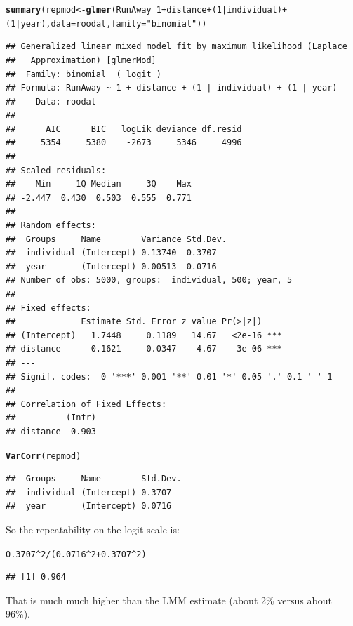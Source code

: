 \documentclass[12pt,a4paper]{scrartcl}\usepackage[]{graphicx}\usepackage[]{color}
\makeatletter
\newcommand{\hlnum}[1]{\textcolor[rgb]{0.686,0.059,0.569}{#1}}%
\newcommand{\hlstr}[1]{\textcolor[rgb]{0.192,0.494,0.8}{#1}}%
\newcommand{\hlopt}[1]{\textcolor[rgb]{0,0,0}{#1}}%
\newcommand{\hlstd}[1]{\textcolor[rgb]{0.345,0.345,0.345}{#1}}%
\newcommand{\hlkwb}[1]{\textcolor[rgb]{0.69,0.353,0.396}{#1}}%
\newcommand{\hlkwc}[1]{\textcolor[rgb]{0.333,0.667,0.333}{#1}}%
\newcommand{\hlkwd}[1]{\textcolor[rgb]{0.737,0.353,0.396}{\textbf{#1}}}%
\newenvironment{kframe}{%
 \def\at@end@of@kframe{}%
 \ifinner\ifhmode%
  \def\at@end@of@kframe{\end{minipage}}%
  \begin{minipage}{\columnwidth}%
 \fi\fi%
 \def\FrameCommand##1{\hskip\@totalleftmargin \hskip-\fboxsep
 \colorbox{shadecolor}{##1}\hskip-\fboxsep
     \hskip-\linewidth \hskip-\@totalleftmargin \hskip\columnwidth}%
 \MakeFramed {\advance\hsize-\width
   \@totalleftmargin\z@ \linewidth\hsize
   \@setminipage}}%
 {\par\unskip\endMakeFramed%
 \at@end@of@kframe}
\newenvironment{knitrout}{}{} %
\makeatother
\begin{document}
\begin{Answer}
\begin{knitrout}
\color{fgcolor}\begin{kframe}
\begin{alltt}
\hlkwd{summary}\hlstd{(repmod} \hlkwb{<-} \hlkwd{glmer}\hlstd{(RunAway} \hlopt{~} \hlnum{1} \hlopt{+} \hlstd{distance} \hlopt{+}\hlstd{(}\hlnum{1}\hlopt{|}\hlstd{individual)} \hlopt{+}
                          \hlstd{(}\hlnum{1}\hlopt{|}\hlstd{year),} \hlkwc{data} \hlstd{= roodat,} \hlkwc{family} \hlstd{=} \hlstr{"binomial"}\hlstd{))}
\end{alltt}
\begin{verbatim}
## Generalized linear mixed model fit by maximum likelihood (Laplace
##   Approximation) [glmerMod]
##  Family: binomial  ( logit )
## Formula: RunAway ~ 1 + distance + (1 | individual) + (1 | year)
##    Data: roodat
## 
##      AIC      BIC   logLik deviance df.resid 
##     5354     5380    -2673     5346     4996 
## 
## Scaled residuals: 
##    Min     1Q Median     3Q    Max 
## -2.447  0.430  0.503  0.555  0.771 
## 
## Random effects:
##  Groups     Name        Variance Std.Dev.
##  individual (Intercept) 0.13740  0.3707  
##  year       (Intercept) 0.00513  0.0716  
## Number of obs: 5000, groups:  individual, 500; year, 5
## 
## Fixed effects:
##             Estimate Std. Error z value Pr(>|z|)    
## (Intercept)   1.7448     0.1189   14.67   <2e-16 ***
## distance     -0.1621     0.0347   -4.67    3e-06 ***
## ---
## Signif. codes:  0 '***' 0.001 '**' 0.01 '*' 0.05 '.' 0.1 ' ' 1
## 
## Correlation of Fixed Effects:
##          (Intr)
## distance -0.903
\end{verbatim}
\begin{alltt}
\hlkwd{VarCorr}\hlstd{(repmod)}
\end{alltt}
\begin{verbatim}
##  Groups     Name        Std.Dev.
##  individual (Intercept) 0.3707  
##  year       (Intercept) 0.0716
\end{verbatim}
\end{kframe}
\end{knitrout}

So the repeatability on the logit scale is:
\begin{knitrout}
\color{fgcolor}\begin{kframe}
\begin{alltt}
\hlnum{0.3707}\hlopt{^}\hlnum{2}\hlopt{/}\hlstd{(}\hlnum{0.0716}\hlopt{^}\hlnum{2}\hlopt{+}\hlnum{0.3707}\hlopt{^}\hlnum{2}\hlstd{)}
\end{alltt}
\begin{verbatim}
## [1] 0.964
\end{verbatim}
\end{kframe}
\end{knitrout}
That is much much higher than the LMM estimate (about 2\% versus about 96\%). 


\end{Answer}
\end{document}
